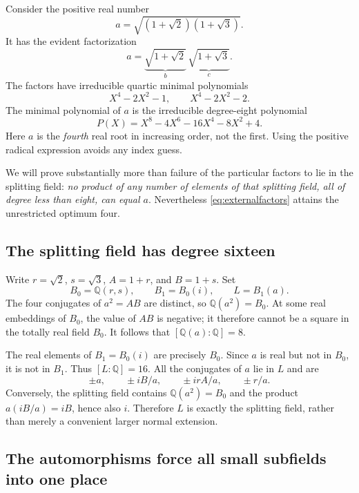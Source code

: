 \documentclass[11pt,a4paper]{article}
\theoremstyle{definition}\newtheorem{definition}[theorem]{Definition}
\theoremstyle{remark}\newtheorem{remark}[theorem]{Remark}
\newcommand{\Q}{\mathbb Q}
\begin{document}
Consider the positive real number
\begin{equation}
 a=\sqrt{(1+\sqrt2)(1+\sqrt3)}.
 \label{eq:externalalpha}
\end{equation}
It has the evident factorization
\begin{equation}
 a=\underbrace{\sqrt{1+\sqrt2}}_{b}\,
   \underbrace{\sqrt{1+\sqrt3}}_{c}.
 \label{eq:externalfactors}
\end{equation}
The factors have irreducible quartic minimal polynomials
\[
 X^4-2X^2-1,\qquad X^4-2X^2-2.
\]
The minimal polynomial of $a$ is the irreducible degree-eight polynomial
\begin{equation}
 P(X)=X^8-4X^6-16X^4-8X^2+4.
 \label{eq:externalpoly}
\end{equation}
Here $a$ is the \emph{fourth} real root in increasing order, not the first.
Using the positive radical expression avoids any index guess.

We will prove substantially more than failure of the particular factors to
lie in the splitting field: \emph{no product of any number of elements of
that splitting field, all of degree less than eight, can equal $a$}.
Nevertheless \eqref{eq:externalfactors} attains the unrestricted optimum
four.

\subsection{The splitting field has degree sixteen}

Write $r=\sqrt2$, $s=\sqrt3$, $A=1+r$, and $B=1+s$. Set
\[
 B_0=\Q(r,s),\qquad B_1=B_0(i),\qquad L=B_1(a).
\]
The four conjugates of $a^2=AB$ are distinct, so $\Q(a^2)=B_0$.
At some real embeddings of $B_0$, the value of $AB$ is negative; it
therefore cannot be a square in the totally real field $B_0$. It follows
that $[\Q(a):\Q]=8$.

The real elements of $B_1=B_0(i)$ are precisely $B_0$. Since $a$ is real
but not in $B_0$, it is not in $B_1$. Thus $[L:\Q]=16$. All the
conjugates of $a$ lie in $L$ and are
\begin{equation}
 \pm a,\qquad \pm iB/a,\qquad
 \pm irA/a,\qquad \pm r/a.
 \label{eq:allconjugates}
\end{equation}
Conversely, the splitting field contains $\Q(a^2)=B_0$ and the product
$a(iB/a)=iB$, hence also $i$. Therefore $L$ is exactly the splitting
field, rather than merely a convenient larger normal extension.

\subsection{The automorphisms force all small subfields into one place}
\end{document}
